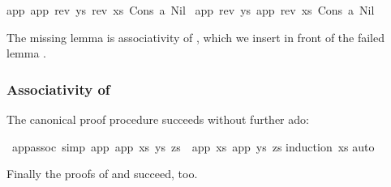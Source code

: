 \begin{isabellebody}
\begin{isamarkuptxt}
\begin{isabelle}
app\ {}app\ {}rev\ ys{}\ {}rev\ xs{}{}\ {}Cons\ a\ Nil{}\ {}\isanewline
{}app\ {}rev\ ys{}\ {}app\ {}rev\ xs{}\ {}Cons\ a\ Nil{}{}%
\end{isabelle}
The missing lemma is associativity of ,
which we insert in front of the failed lemma .

\subsubsection{Associativity of }

The canonical proof procedure succeeds without further ado:%
\end{isamarkuptxt}%
\isamarkuptrue%
%
\endisatagproof
{\isafoldproof}%
%
\isadelimproof
%
\endisadelimproof
{}\isamarkupfalse%
\ app{}assoc\ {}simp{}{}\ {}app\ {}app\ xs\ ys{}\ zs\ {}\ app\ xs\ {}app\ ys\ zs{}{}\isanewline
%
\isadelimproof
%
\endisadelimproof
%
\isatagproof
{}\isamarkupfalse%
{}induction\ xs{}\isanewline
{}\isamarkupfalse%
{}auto{}\isanewline
{}\isamarkupfalse%
%
\endisatagproof
{\isafoldproof}%
%
\isadelimproof
%
\endisadelimproof
%
\isadelimproof
%
\endisadelimproof
%
\isatagproof
%
\endisatagproof
{\isafoldproof}%
%
\isadelimproof
%
\endisadelimproof
%
\isadelimproof
%
\endisadelimproof
%
\isatagproof
%
\endisatagproof
{\isafoldproof}%
%
\isadelimproof
%
\endisadelimproof
%
\begin{isamarkuptext}%
Finally the proofs of  and 
succeed, too.


\end{isamarkuptext}
\end{isabellebody}
